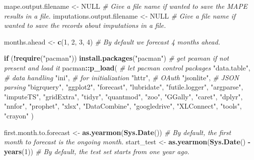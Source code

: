 \documentclass[
]{article}
\newenvironment{Shaded}{\begin{snugshade}}{\end{snugshade}}
\newcommand{\CommentTok}[1]{\textcolor[rgb]{0.56,0.35,0.01}{\textit{#1}}}
\newcommand{\ConstantTok}[1]{\textcolor[rgb]{0.56,0.35,0.01}{#1}}
\newcommand{\ControlFlowTok}[1]{\textcolor[rgb]{0.13,0.29,0.53}{\textbf{#1}}}
\newcommand{\DecValTok}[1]{\textcolor[rgb]{0.00,0.00,0.81}{#1}}
\newcommand{\FunctionTok}[1]{\textcolor[rgb]{0.13,0.29,0.53}{\textbf{#1}}}
\newcommand{\NormalTok}[1]{#1}
\newcommand{\OtherTok}[1]{\textcolor[rgb]{0.56,0.35,0.01}{#1}}
\newcommand{\SpecialCharTok}[1]{\textcolor[rgb]{0.81,0.36,0.00}{\textbf{#1}}}
\newcommand{\StringTok}[1]{\textcolor[rgb]{0.31,0.60,0.02}{#1}}
\begin{document}
\begin{Shaded}
\begin{Highlighting}[]
\NormalTok{  mape.output.filename }\OtherTok{\textless{}{-}} \ConstantTok{NULL} \CommentTok{\# Give a file name if wanted to save the MAPE results in a file.}
\NormalTok{  imputations.output.filename }\OtherTok{\textless{}{-}} \ConstantTok{NULL} \CommentTok{\# Give a file name if wanted to save the records about imputations in a file.}
  
\NormalTok{  months.ahead }\OtherTok{\textless{}{-}} \FunctionTok{c}\NormalTok{(}\DecValTok{1}\NormalTok{, }\DecValTok{2}\NormalTok{, }\DecValTok{3}\NormalTok{, }\DecValTok{4}\NormalTok{) }\CommentTok{\# By default we forecast 4 months ahead.}
  
  \ControlFlowTok{if}\NormalTok{ (}\SpecialCharTok{!}\FunctionTok{require}\NormalTok{(}\StringTok{"pacman"}\NormalTok{)) }\FunctionTok{install.packages}\NormalTok{(}\StringTok{"pacman"}\NormalTok{) }\CommentTok{\# get pcaman if not present and load it}
\NormalTok{  pacman}\SpecialCharTok{::}\FunctionTok{p\_load}\NormalTok{( }\CommentTok{\# let pacman control packages}
    \StringTok{"data.table"}\NormalTok{,  }\CommentTok{\# data handling}
    \StringTok{"ini"}\NormalTok{,  }\CommentTok{\# for initialization}
    \StringTok{"httr"}\NormalTok{,  }\CommentTok{\# OAuth}
    \StringTok{"jsonlite"}\NormalTok{,  }\CommentTok{\# JSON parsing}
    \StringTok{"bigrquery"}\NormalTok{,}
    \StringTok{"ggplot2"}\NormalTok{,}
    \StringTok{"forecast"}\NormalTok{,}
    \StringTok{"lubridate"}\NormalTok{,}
    \StringTok{"futile.logger"}\NormalTok{,}
    \StringTok{"argparse"}\NormalTok{,}
    \StringTok{"imputeTS"}\NormalTok{,}
    \StringTok{"gridExtra"}\NormalTok{,}
    \StringTok{"tidyr"}\NormalTok{,}
    \StringTok{"quantmod"}\NormalTok{,}
    \StringTok{"zoo"}\NormalTok{,}
    \StringTok{"GGally"}\NormalTok{,}
    \StringTok{"caret"}\NormalTok{,}
    \StringTok{"dplyr"}\NormalTok{,}
    \StringTok{"nnfor"}\NormalTok{,}
    \StringTok{"prophet"}\NormalTok{,}
    \StringTok{"xlsx"}\NormalTok{,}
    \StringTok{"DataCombine"}\NormalTok{,}
    \StringTok{"googledrive"}\NormalTok{,}
    \StringTok{"XLConnect"}\NormalTok{,}
    \StringTok{"tools"}\NormalTok{,}
    \StringTok{"crayon"}
\NormalTok{  )}
  
\NormalTok{  first.month.to.forecast }\OtherTok{\textless{}{-}} \FunctionTok{as.yearmon}\NormalTok{(}\FunctionTok{Sys.Date}\NormalTok{())          }\CommentTok{\# By default, the first month to forecast is the ongoing month.}
\NormalTok{  start\_test }\OtherTok{\textless{}{-}} \FunctionTok{as.yearmon}\NormalTok{(}\FunctionTok{Sys.Date}\NormalTok{() }\SpecialCharTok{{-}} \FunctionTok{years}\NormalTok{(}\DecValTok{1}\NormalTok{))            }\CommentTok{\# By default, the test set starts from one year ago.}
  

\end{Highlighting}
\end{Shaded}
\end{document}
